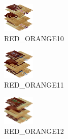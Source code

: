 \hspace{0.1cm}
\begin{minipage}[b]{0.15\linewidth}
\begin{figure}[H]                                                          
  \centering                                                             
  \begin{adjustbox}{width=1.5cm,center}                                   
  \includegraphics[width=1.5cm]{src/colorspace_colourflow/flows/colourflow_42-45.png}%
  \end{adjustbox}                                                        
\caption*{RED\_ORANGE10}                                           
\end{figure}                                                               
\end{minipage}
\hspace{0.1cm}
\begin{minipage}[b]{0.15\linewidth}
\begin{figure}[H]                                                          
  \centering                                                             
  \begin{adjustbox}{width=1.5cm,center}                                   
  \includegraphics[width=1.5cm]{src/colorspace_colourflow/flows/colourflow_43-45.png}%
  \end{adjustbox}                                                        
\caption*{RED\_ORANGE11}                                           
\end{figure}                                                               
\end{minipage}
\hspace{0.1cm}
\begin{minipage}[b]{0.15\linewidth}
\begin{figure}[H]                                                          
  \centering                                                             
  \begin{adjustbox}{width=1.5cm,center}                                   
  \includegraphics[width=1.5cm]{src/colorspace_colourflow/flows/colourflow_44-45.png}%
  \end{adjustbox}                                                        
\caption*{RED\_ORANGE12}                                           
\end{figure}                                                               
\end{minipage}
